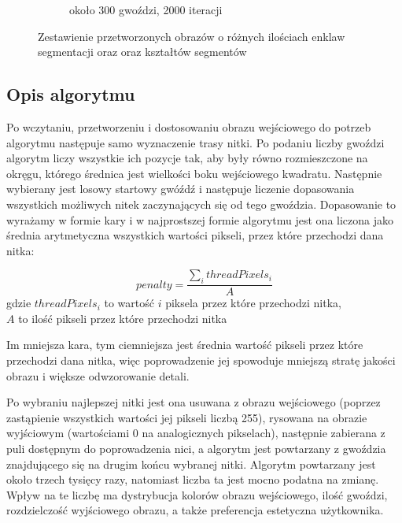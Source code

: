 \documentclass[a4paper, 12pt, polish, twoside]{extreport}
\begin{document}
\begin{figure}[H]
\begin{subfigure}{0.23\textwidth}
            \caption{około 300 gwoździ, 2000 iteracji}
            \label{theory-segments-thread-d}
        \end{subfigure}
        \caption{Zestawienie przetworzonych obrazów o różnych ilościach enklaw segmentacji oraz oraz kształtów segmentów}
        \label{theory-segments-thread}
        \end{figure}
        
        \subsection{Opis algorytmu} \label{theory-std-method-algorithm}
        Po wczytaniu, przetworzeniu i dostosowaniu obrazu wejściowego do potrzeb algorytmu następuje samo wyznaczenie trasy nitki. Po podaniu liczby gwoździ algorytm liczy wszystkie ich pozycje tak, aby były równo rozmieszczone na okręgu, którego średnica jest wielkości boku wejściowego kwadratu. Następnie wybierany jest losowy startowy gwóźdź i następuje liczenie dopasowania wszystkich możliwych nitek zaczynających się od tego gwoździa. Dopasowanie to wyrażamy w formie kary i w najprostszej formie algorytmu jest ona liczona jako średnia arytmetyczna wszystkich wartości pikseli, przez które przechodzi dana nitka: 
        
        \begin{equation} \label{theory-std-method-penalty}
            penalty = \frac{\sum_{i} threadPixels_{i}}{A}
        \end{equation}
        gdzie \(threadPixels_{i}\) to wartość \(i\) piksela przez które przechodzi nitka, \\
        \(A\) to ilość pikseli przez które przechodzi nitka
        
        Im mniejsza kara, tym ciemniejsza jest średnia wartość pikseli przez które przechodzi dana nitka, więc poprowadzenie jej spowoduje mniejszą stratę jakości obrazu i większe odwzorowanie detali.
        
        Po wybraniu najlepszej nitki jest ona usuwana z obrazu wejściowego (poprzez zastąpienie wszystkich wartości jej pikseli liczbą 255), rysowana na obrazie wyjściowym (wartościami 0 na analogicznych pikselach), następnie zabierana z puli dostępnym do poprowadzenia nici, a algorytm jest powtarzany z gwoździa znajdującego się na drugim końcu wybranej nitki. Algorytm powtarzany jest około trzech tysięcy razy, natomiast liczba ta jest mocno podatna na zmianę. Wpływ na te liczbę ma dystrybucja kolorów obrazu wejściowego, ilość gwoździ, rozdzielczość wyjściowego obrazu, a także preferencja estetyczna użytkownika.
        
\end{document}
